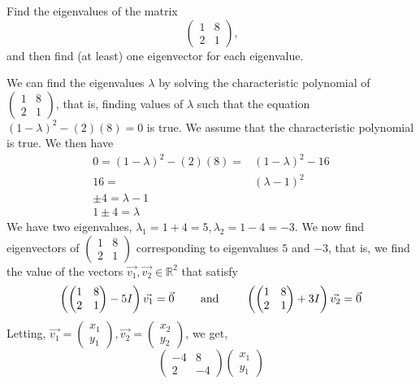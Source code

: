 \documentclass[12pt]{article}
\newenvironment{problem}[2][Problem]
{
	\begin{trivlist} 
		\item[\hskip \labelsep {\bfseries #1 #2:}]
	}
{
	\end{trivlist}
	}
\newenvironment{solution}[1][Solution]
{
	\begin{trivlist} 
		\item[\hskip \labelsep {\itshape #1:}]
	}
	{
	\end{trivlist}
}
\begin{document}
\newpage
\begin{problem}{2}
Find the eigenvalues of the matrix
\[
\begin{pmatrix}1&8\\2&1\end{pmatrix} \text{,}
\]
and then find (at least) one eigenvector for each eigenvalue.
\noindent
\newline
\newline
\begin{solution}
We can find the eigenvalues $\lambda$ by solving the characteristic polynomial of $\begin{pmatrix} 1&8\\2&1 \end{pmatrix}$, that is, finding values of $\lambda$ such that the equation $(1-\lambda)^2 - (2)(8) = 0$ is true. We assume that the characteristic polynomial is true. We then have
\begin{align}
0=(1-\lambda)^2 - (2)(8)=& (1-\lambda)^2 - 16 \\
16=& (\lambda-1)^2\\
\pm 4 = \lambda-1\\
1 \pm 4 =\lambda
\end{align}
We have two eigenvalues, $\lambda_{1} = 1+4=5, \lambda_{2} = 1-4 =-3$. We now find eigenvectors of $\begin{pmatrix}1&8\\2&1\end{pmatrix}$ corresponding to eigenvalues $5$ and $-3$, that is, we find the value of the vectors $\vec{v_{1}}, \vec{v_{2}} \in \mathbb{R}^2$ that satisfy
\[
\left( \begin{pmatrix}1&8\\2&1\end{pmatrix} - 5I \right) \vec{v_{1}} = \vec{0}
 \hphantom{1000}
 \text{ and }
 \hphantom{1000}
\left( \begin{pmatrix}1&8\\2&1\end{pmatrix} +3I \right) \vec{v_{2}} = \vec{0}
\]
Letting, $\vec{v_{1}}=\begin{pmatrix} x_{1}\\y_{1}\end{pmatrix},\vec{v_{2}} = \begin{pmatrix} x_{2}\\y_{2}\end{pmatrix}$, we get,
\[
\begin{pmatrix}-4&8\\2&-4\end{pmatrix} \begin{pmatrix} x_{1}\\y_{1}\end{pmatrix} %
\]
\end{solution}
\end{problem}
\end{document}
